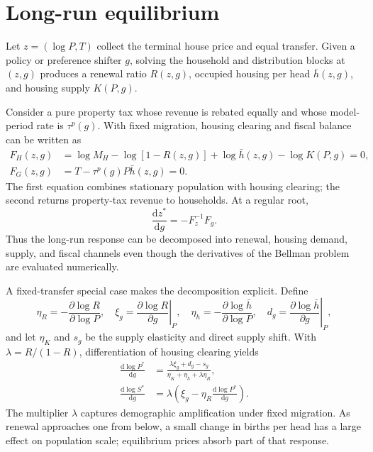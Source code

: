 \documentclass[11pt]{article}
\newcommand{\dd}{\mathrm{d}}
\begin{document}
\section{Long-run equilibrium}

Let $z=(\log P,T)$ collect the terminal house price and equal transfer.  Given
a policy or preference shifter $g$, solving the household and distribution
blocks at $(z,g)$ produces a renewal ratio $R(z,g)$, occupied housing per head
$\bar h(z,g)$, and housing supply $K(P,g)$.

Consider a pure property tax whose revenue is rebated equally and whose
model-period rate is $\tau^p(g)$.  With fixed migration, housing clearing and
fiscal balance can be written as
\begin{align}
 F_H(z,g)
&=\log M_H-\log[1-R(z,g)]+\log\bar h(z,g)-\log K(P,g)=0,
 \label{eq:terminal_housing}\\
 F_G(z,g)
 &=T-\tau^p(g)P\bar h(z,g)=0.
 \label{eq:terminal_budget}
\end{align}
The first equation combines stationary population with housing clearing; the
second returns property-tax revenue to households.  At a regular root,
\begin{equation}
 \frac{\dd z^*}{\dd g}=-F_z^{-1}F_g.
 \label{eq:terminal_ift}
\end{equation}
Thus the long-run response can be decomposed into renewal, housing demand,
supply, and fiscal channels even though the derivatives of the Bellman problem
are evaluated numerically.

A fixed-transfer special case makes the decomposition explicit.  Define
\begin{equation}
 \eta_R=-\frac{\partial\log R}{\partial\log P},\quad
 \xi_g=\left.\frac{\partial\log R}{\partial g}\right|_P,\quad
 \eta_h=-\frac{\partial\log\bar h}{\partial\log P},\quad
 d_g=\left.\frac{\partial\log\bar h}{\partial g}\right|_P,
 \label{eq:elasticities}
\end{equation}
and let $\eta_K$ and $s_g$ be the supply elasticity and direct supply shift.
With $\lambda=R/(1-R)$, differentiation of housing clearing yields
\begin{align}
 \frac{\dd\log P^*}{\dd g}
&=\frac{\lambda\xi_g+d_g-s_g}
 {\eta_K+\eta_h+\lambda\eta_R},
 \label{eq:price_elasticity}\\
 \frac{\dd\log S^*}{\dd g}
 &=\lambda\left(\xi_g-\eta_R
 \frac{\dd\log P^*}{\dd g}\right).
 \label{eq:population_elasticity}
\end{align}
The multiplier $\lambda$ captures demographic amplification under fixed
migration.  As renewal approaches one from below, a small change in births per
head has a large effect on population scale; equilibrium prices absorb part of
that response.
\end{document}
